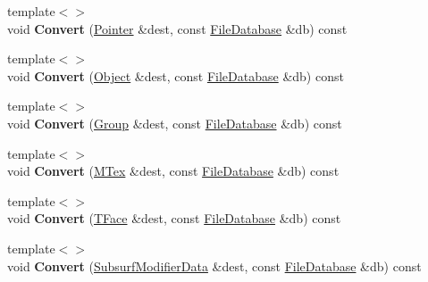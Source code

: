 \begin{DoxyCompactItemize}
\item 
\hypertarget{class_assimp_1_1_blender_1_1_structure_a7c6a9a878896b0bf746d1108567f0588}{{\footnotesize template$<$$>$ }\\void {\bfseries Convert} (\hyperlink{struct_assimp_1_1_blender_1_1_pointer}{Pointer} \&dest, const \hyperlink{class_assimp_1_1_blender_1_1_file_database}{File\+Database} \&db) const }\label{class_assimp_1_1_blender_1_1_structure_a7c6a9a878896b0bf746d1108567f0588}

\item 
\hypertarget{class_assimp_1_1_blender_1_1_structure_a5c01ea901e59fc4d790cd5fc99d66f32}{{\footnotesize template$<$$>$ }\\void {\bfseries Convert} (\hyperlink{struct_assimp_1_1_blender_1_1_object}{Object} \&dest, const \hyperlink{class_assimp_1_1_blender_1_1_file_database}{File\+Database} \&db) const }\label{class_assimp_1_1_blender_1_1_structure_a5c01ea901e59fc4d790cd5fc99d66f32}

\item 
\hypertarget{class_assimp_1_1_blender_1_1_structure_aef8daf0da3af48a2c6f5ede04abdfe7d}{{\footnotesize template$<$$>$ }\\void {\bfseries Convert} (\hyperlink{struct_assimp_1_1_blender_1_1_group}{Group} \&dest, const \hyperlink{class_assimp_1_1_blender_1_1_file_database}{File\+Database} \&db) const }\label{class_assimp_1_1_blender_1_1_structure_aef8daf0da3af48a2c6f5ede04abdfe7d}

\item 
\hypertarget{class_assimp_1_1_blender_1_1_structure_a3b85a55ba081811b36fa662be68d31f4}{{\footnotesize template$<$$>$ }\\void {\bfseries Convert} (\hyperlink{struct_assimp_1_1_blender_1_1_m_tex}{M\+Tex} \&dest, const \hyperlink{class_assimp_1_1_blender_1_1_file_database}{File\+Database} \&db) const }\label{class_assimp_1_1_blender_1_1_structure_a3b85a55ba081811b36fa662be68d31f4}

\item 
\hypertarget{class_assimp_1_1_blender_1_1_structure_ad97f92c30d6efb4e5283878ee9a62377}{{\footnotesize template$<$$>$ }\\void {\bfseries Convert} (\hyperlink{struct_assimp_1_1_blender_1_1_t_face}{T\+Face} \&dest, const \hyperlink{class_assimp_1_1_blender_1_1_file_database}{File\+Database} \&db) const }\label{class_assimp_1_1_blender_1_1_structure_ad97f92c30d6efb4e5283878ee9a62377}

\item 
\hypertarget{class_assimp_1_1_blender_1_1_structure_a6f03fc525e520cbdb9d7cbe163cd4bf9}{{\footnotesize template$<$$>$ }\\void {\bfseries Convert} (\hyperlink{struct_assimp_1_1_blender_1_1_subsurf_modifier_data}{Subsurf\+Modifier\+Data} \&dest, const \hyperlink{class_assimp_1_1_blender_1_1_file_database}{File\+Database} \&db) const }\label{class_assimp_1_1_blender_1_1_structure_a6f03fc525e520cbdb9d7cbe163cd4bf9}


\end{DoxyCompactItemize}
